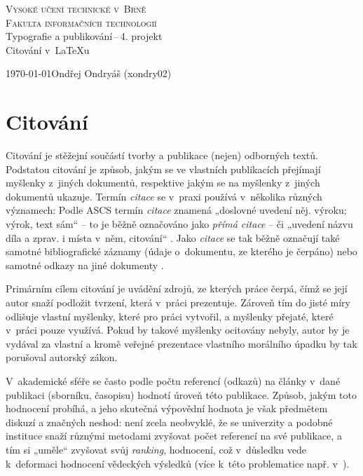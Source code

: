 \documentclass[11pt]{article}
\begin{document}
\begin{titlepage}
\begin{center}
\Huge\textsc{Vysoké učení technické v~Brně}\\\huge\textsc{Fakulta informačních technologií}\\
\LARGE
Typografie a publikování\,--\,4. projekt\\
\Huge
Citování v~\LaTeX u\\
\end{center}
{\Large \today \hfill Ondřej Ondryáš (xondry02)}
\end{titlepage}

\section{Citování}
Citování je stěžejní součástí tvorby a publikace (nejen) odborných textů. Podstatou citování je způsob, jakým se ve vlastních publikacích přejímají myšlenky z~jiných dokumentů, respektive jakým se na myšlenky z~jiných dokumentů ukazuje. Termín \emph{citace} se v~praxi používá v~několika různých významech: Podle ASCS termín \emph{citace} znamená „doslovné uvedení něj. výroku; výrok, text sám“ -- to je běžně označováno jako \emph{přímá citace} -- či „uvedení názvu díla a zprav. i místa v~něm, citování“ \cite{ascs}. Jako \emph{citace} se tak běžně označují také samotné bibliografické záznamy (údaje o~dokumentu, ze kterého je čerpáno) nebo samotné odkazy na jiné dokumenty \cite{ktd_citace}.

Primárním cílem citování je uvádění zdrojů, ze kterých práce čerpá, čímž se její autor snaží podložit tvrzení, která v~práci prezentuje. Zároveň tím do jisté míry odlišuje vlastní myšlenky, které pro práci vytvořil, a myšlenky přejaté, které v~práci pouze využívá. Pokud by takové myšlenky ocitovány nebyly, autor by je vydával za vlastní a kromě veřejné prezentace vlastního morálního úpadku by tak porušoval autorský zákon. 

V~akademické sféře se často podle počtu referencí (odkazů) na články v~dané publikaci (sborníku, časopisu) hodnotí úroveň této publikace. Způsob, jakým toto hodnocení probíhá, a jeho skutečná výpovědní hodnota je však předmětem diskuzí a značných neshod: není zcela neobvyklé, že se univerzity a podobné instituce snaží různými metodami zvyšovat počet referencí na své publikace, a tím si „uměle“ zvyšovat svůj \emph{ranking}, hodnocení, což v~důsledku vede k~deformaci hodnocení vědeckých výsledků (více k~této problematice např. v~\cite{reedijk_citations_ethics}).
\end{document}
